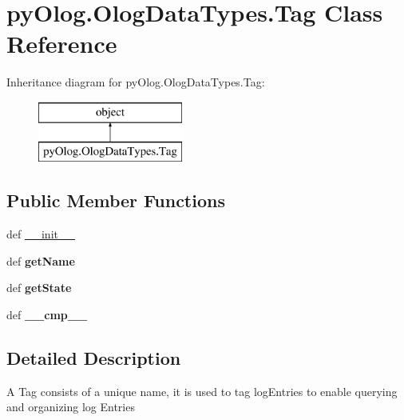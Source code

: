 \hypertarget{classpyOlog_1_1OlogDataTypes_1_1Tag}{\section{py\-Olog.\-Olog\-Data\-Types.\-Tag Class Reference}
\label{classpyOlog_1_1OlogDataTypes_1_1Tag}
}
Inheritance diagram for py\-Olog.\-Olog\-Data\-Types.\-Tag\-:\begin{figure}[H]
\begin{center}
\leavevmode
\includegraphics[height=2.000000cm]{classpyOlog_1_1OlogDataTypes_1_1Tag}
\end{center}
\end{figure}
\subsection*{Public Member Functions}
\begin{DoxyCompactItemize}
\item 
def \hyperlink{classpyOlog_1_1OlogDataTypes_1_1Tag_add599a45f6036ce7b6e14068c8ab07dd}{\-\_\-\-\_\-init\-\_\-\-\_\-}
\item 
\hypertarget{classpyOlog_1_1OlogDataTypes_1_1Tag_a568b1629e04fdf3d992e6820e0ed6c71}{def {\bfseries get\-Name}}\label{classpyOlog_1_1OlogDataTypes_1_1Tag_a568b1629e04fdf3d992e6820e0ed6c71}

\item 
\hypertarget{classpyOlog_1_1OlogDataTypes_1_1Tag_a71aa91e396e5614ce9237cf8166d4d31}{def {\bfseries get\-State}}\label{classpyOlog_1_1OlogDataTypes_1_1Tag_a71aa91e396e5614ce9237cf8166d4d31}

\item 
\hypertarget{classpyOlog_1_1OlogDataTypes_1_1Tag_a63bd5eadbe61824f9a0b152d911f4e9d}{def {\bfseries \-\_\-\-\_\-cmp\-\_\-\-\_\-}}\label{classpyOlog_1_1OlogDataTypes_1_1Tag_a63bd5eadbe61824f9a0b152d911f4e9d}

\end{DoxyCompactItemize}


\subsection{Detailed Description}
\begin{DoxyVerb}A Tag consists of a unique name, it is used to tag logEntries to enable querying and organizing log Entries
\end{DoxyVerb}
 

